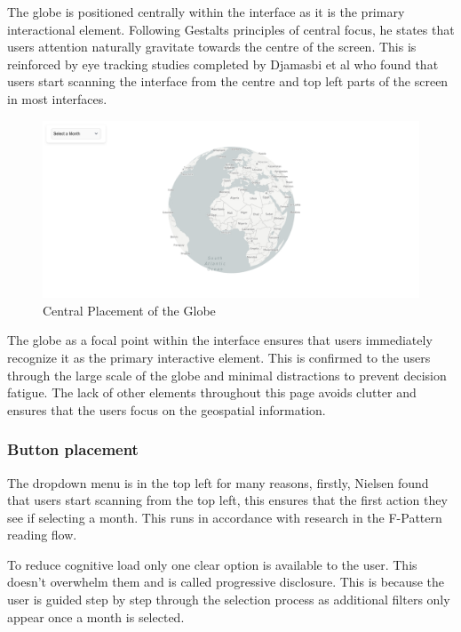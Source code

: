 \documentclass[]{project_final}
\begin{document}
The globe is positioned centrally within the interface as it is the primary interactional element. Following Gestalts principles of central focus, he states that users attention naturally gravitate towards the centre of the screen. This is reinforced by eye tracking studies completed by Djamasbi et al who found that users start scanning the interface from the centre and top left parts of the screen in most interfaces.

\begin{figure}[ht!]
  \centering
  \includegraphics[width=\textwidth]{1.png}
  \caption{Central Placement of the Globe}
  \label{fig:1}
\end{figure}

The globe as a focal point within the interface ensures that users immediately recognize it as the primary interactive element. This is confirmed to the users through the large scale of the globe and minimal distractions to prevent decision fatigue. The lack of other elements throughout this page avoids clutter and ensures that the users focus on the geospatial information.

\subsubsection{Button placement}

The dropdown menu is in the top left for many reasons, firstly, Nielsen found that users start scanning from the top left, this ensures that the first action they see if selecting a month. This runs in accordance with research in the F-Pattern reading flow.

To reduce cognitive load only one clear option is available to the user. This doesn't overwhelm them and is called progressive disclosure. This is because the user is guided step by step through the selection process as additional filters only appear once a month is selected.
\end{document}
